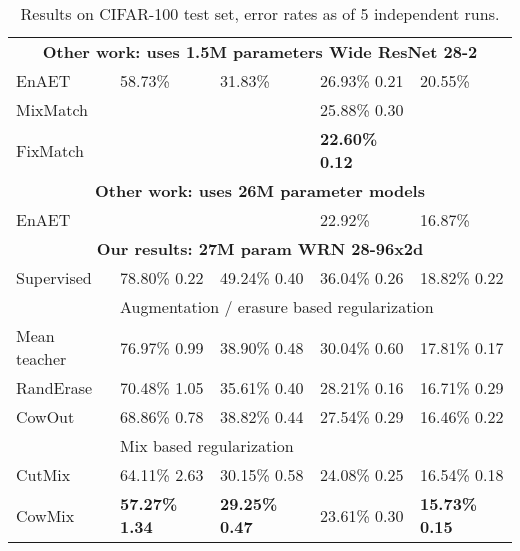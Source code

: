 \documentclass{article}
\newcommand{\eb}[1]{\scriptsize\,\,#1}
\newcommand{\RR}[1]{\raisebox{-0.25mm}{#1}}
\begin{document}
\begin{table}[h]
\centering
\setlength{\tabcolsep}{2mm}\begin{tabular}{@{ }lllll@{ }}
\hline
\RR{\bf \# Labels}
    & \RR{\bf 1000}
    & \RR{\bf 5000}
    & \RR{\bf 10000}
    & \RR{\bf ALL} \\
\hline
\hline

\multicolumn{5}{c}{\footnotesize{\textbf{Other work: uses 1.5M parameters Wide ResNet 28-2 }}} \\

EnAET                 & 58.73\%               & 31.83\%               & 26.93\%\eb{0.21}      & 20.55\%          \\
MixMatch              &                       &                       & 25.88\%\eb{0.30}      &                  \\ 
FixMatch              &                       &                       & \bf22.60\%\eb{0.12}   &                  \\ 

\hline

\multicolumn{5}{c}{\footnotesize{\textbf{Other work: uses 26M parameter models}}}\\

EnAET                 &                       &                       & 22.92\%               & 16.87\%          \\ 

\multicolumn{5}{c}{\footnotesize{\textbf{Our results: 27M param WRN 28-96x2d}}}\\
Supervised            & 78.80\%\eb{0.22}      & 49.24\%\eb{0.40}      & 36.04\%\eb{0.26}      & 18.82\%\eb{0.22} \\ 

&\multicolumn{4}{l}{\footnotesize{Augmentation / erasure based regularization}}\\
Mean teacher          & 76.97\%\eb{0.99}      & 38.90\%\eb{0.48}      & 30.04\%\eb{0.60}      & 17.81\%\eb{0.17} \\ 
RandErase             & 70.48\%\eb{1.05}      & 35.61\%\eb{0.40}      & 28.21\%\eb{0.16}      & 16.71\%\eb{0.29} \\ 
CowOut                & 68.86\%\eb{0.78}      & 38.82\%\eb{0.44}      & 27.54\%\eb{0.29}      & 16.46\%\eb{0.22} \\ 

&\multicolumn{4}{l}{\footnotesize{Mix based regularization}}\\
CutMix                & 64.11\%\eb{2.63}      & 30.15\%\eb{0.58}      & 24.08\%\eb{0.25}      & 16.54\%\eb{0.18} \\  
CowMix                & \bf57.27\%\eb{1.34}   & \bf29.25\%\eb{0.47}   & 23.61\%\eb{0.30}      & \bf15.73\%\eb{0.15} \\

\hline

\end{tabular}\caption{Results on CIFAR-100 test set, error rates as  of 5 independent runs.}
\label{tab:results:cifar100}
\end{table}
\end{document}
